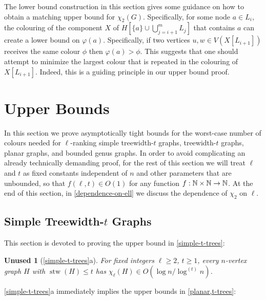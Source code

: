 \documentclass[kpfonts]{patmorin}
\DeclareMathOperator{\stw}{stw}
\newcommand{\trn}{\chi_2}
\newcommand{\lrn}{\chi_{\ell}}
\theoremstyle{named}
\newtheorem*{namedtheorem}{Unused}
\newcommand{\weirdref}[2]{\cref{#1}#2}
\newcommand{\weirdlabel}[2]{\label{#1-#1}}
\begin{document}
The lower bound construction in this section gives some guidance on how to obtain a matching upper bound for $\trn(G)$.  Specifically, for some node $a\in L_i$, the colouring of the component $X$ of $H[\{a\}\cup\bigcup_{j=i+1}^m L_j]$ that contains $a$ can create a lower bound on $\varphi(a)$.  Specifically, if two vertices $u,w\in V(X[L_{i+1}])$ receives the same colour $\phi$ then $\varphi(a)>\phi$.  This suggests that one should attempt to minimize the largest colour that is repeated in the colouring of $X[L_{i+1}]$.  Indeed, this is a guiding principle in our upper bound proof.


\section{Upper Bounds}
\label{upper-bounds}

In this section we prove asymptotically tight bounds for the worst-case number of colours needed for $\ell$-ranking simple treewidth-$t$ graphs, treewidth-$t$ graphs, planar graphs, and bounded genus graphs. In order to avoid complicating an already technically demanding proof, for the rest of this section we will treat $\ell$ and $t$ as fixed constants independent of $n$ and other parameters that are unbounded, so that $f(\ell,t)\in O(1)$ for any function $f:\mathbb{N}\times\mathbb{N}\to\mathbb{N}$.  At the end of this section, in \cref{dependence-on-ell} we discuss the dependence of $\trn$ on $\ell$.


\subsection{Simple Treewidth-$t$ Graphs}
\label{simple-treewidth-section}

This section is devoted to proving the upper bound in \cref{simple-t-trees}:

\begin{namedtheorem}[\weirdref{simple-t-trees}{a}]\weirdlabel{simple-t-trees}{a}
    For fixed integers $\ell\ge 2$, $t\ge 1$, every $n$-vertex graph $H$ with $\stw(H)\le t$ has $\lrn(H)\in O(\log n/\log^{(t)} n)$.
\end{namedtheorem}

\weirdref{simple-t-trees}{a} immediately implies the upper bounds in \cref{planar,t-trees}:
\end{document}
